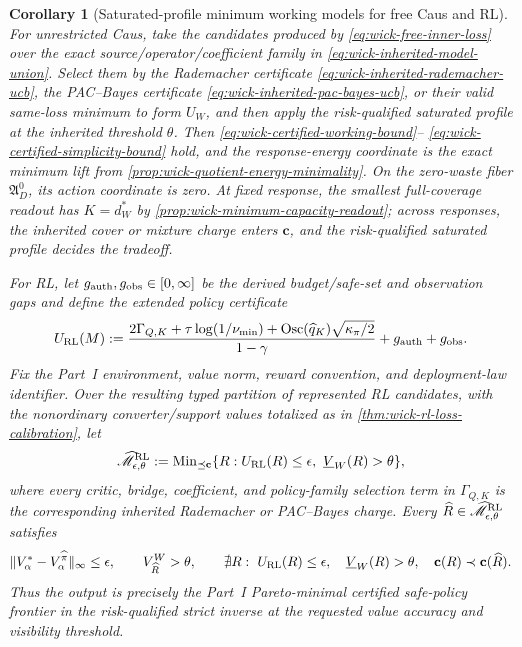 \documentclass[11pt]{article}
\numberwithin{section}{part}
\theoremstyle{plain}
\newtheorem{corollary}[corollary]{Corollary}
\theoremstyle{definition}
\theoremstyle{remark}
\begin{document}
\begin{corollary}[Saturated-profile minimum working models for free Caus and RL]
\label{cor:wick-free-rl-minimal-models}
For unrestricted Caus, take the candidates produced by
\eqref{eq:wick-free-inner-loss} over the exact source/operator/coefficient
family in \eqref{eq:wick-inherited-model-union}.  Select them by the
Rademacher certificate \eqref{eq:wick-inherited-rademacher-ucb}, the
PAC--Bayes certificate \eqref{eq:wick-inherited-pac-bayes-ucb}, or their
valid same-loss minimum to form \(U_W\), and then apply the
risk-qualified saturated profile at the inherited threshold \(\theta\).  Then
\eqref{eq:wick-certified-working-bound}--
\eqref{eq:wick-certified-simplicity-bound} hold, and the response-energy
coordinate is the exact minimum lift from
\cref{prop:wick-quotient-energy-minimality}.  On the zero-waste fiber
\(\mathfrak A_D^0\), its action coordinate is zero.  At fixed response, the
smallest full-coverage readout has \(K=d_W^*\) by
\cref{prop:wick-minimum-capacity-readout}; across responses, the inherited
cover or mixture charge enters \(\mathbf c\), and the risk-qualified saturated
profile decides the tradeoff.

For RL, let \(g_{\rm auth},g_{\rm obs}\in[0,\infty]\) be the derived
budget/safe-set and observation gaps and define the extended policy certificate
\begin{equation}
 \label{eq:wick-rl-working-certificate}
 U_{\rm RL}(M)
 :=\frac{2\Gamma_{Q,K}
 +\tau\log(1/\nu_{\min})
 +\operatorname{Osc}(\widehat q_K)\sqrt{\kappa_\pi/2}}
 {1-\gamma}
 +g_{\rm auth}+g_{\rm obs}.
\end{equation}
Fix the Part~I environment, value norm, reward convention, and deployment-law
identifier.  Over the resulting typed partition of represented RL candidates,
with the nonordinary converter/support values totalized as in
\cref{thm:wick-rl-loss-calibration}, let
\[
 \widehat{\mathscr M}_{\epsilon,\theta}^{\rm RL}
 :=\operatorname{Min}_{\preceq\mathbf c}
 \{R:U_{\rm RL}(R)\le\epsilon,\ \underline V_W(R)>\theta\},
\]
where every critic, bridge, coefficient, and policy-family selection term in
\(\Gamma_{Q,K}\) is the corresponding inherited Rademacher or PAC--Bayes
charge.  Every
\(\widehat R\in\widehat{\mathscr M}_{\epsilon,\theta}^{\rm RL}\)
satisfies
\begin{equation}
 \label{eq:wick-rl-minimal-working-bound}
 \|V_\alpha^*-V_\alpha^{\widehat\pi}\|_\infty\le\epsilon,
 \qquad V^W_{\widehat R}>\theta,
 \qquad
 \nexists R:\ U_{\rm RL}(R)\le\epsilon,\quad
 \underline V_W(R)>\theta,
 \quad\mathbf c(R)\prec\mathbf c(\widehat R).
\end{equation}
Thus the output is precisely the Part~I Pareto-minimal certified safe-policy
frontier in the risk-qualified strict inverse at the requested value accuracy
and visibility threshold.
\end{corollary}
\end{document}
